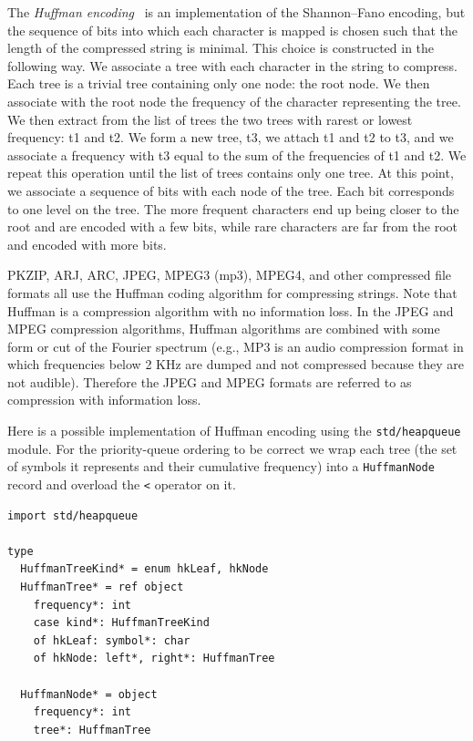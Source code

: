 \documentclass[justified, sixbynine]{tufte-book}
\def\ft{\small\tt}
\theoremstyle{plain}%
\newtheorem * {corollary}{Corollary}
\theoremstyle{definition}
\theoremstyle{remark}
\newtheorem * {remark}{Remark}
\newtheorem * {note}{Note}
\begin{document}
\begin{fullwidth}
The {\it Huffman encoding}~\cite{huffman} is an implementation of the Shannon--Fano encoding, but the sequence of bits into which each character is mapped is chosen such that the length of the compressed string is minimal.
This choice is constructed in the following way.
We associate a tree with each character
in the string to compress. Each tree is a trivial tree containing only one
node: the root node. We then associate with the root node the frequency of the
character representing the tree. We then extract from the list of trees the
two trees with rarest or lowest frequency: t1 and t2. We form a new tree, t3, we attach
t1 and t2 to t3, and we associate a frequency with t3 equal to the sum of the
frequencies of t1 and t2. We repeat this operation until the list of trees
contains only one tree. At this point, we associate a sequence of bits with
each node of the tree. Each bit corresponds to one level on the tree. The
more frequent characters end up being closer to the root and are encoded
with a few bits, while rare characters are far from the root and encoded with
more bits.

PKZIP, ARJ, ARC, JPEG, MPEG3 (mp3), MPEG4, and other
compressed file formats all use the Huffman coding algorithm for compressing
strings. Note that Huffman is a compression algorithm with
no information loss. In the JPEG and MPEG compression algorithms, Huffman algorithms are
combined with some form or cut of the Fourier spectrum (e.g., MP3 is
an audio compression format in which frequencies below 2 KHz are dumped and not
compressed because they are not audible). Therefore the JPEG and MPEG
formats are referred to as compression with information loss.

Here is a possible implementation of Huffman encoding using the {\ft std/heapqueue} module. For the priority-queue ordering to be correct we wrap each tree (the set of symbols it represents and their cumulative frequency) into a {\ft HuffmanNode} record and overload the {\ft <} operator on it.

\begin{lstlisting}[caption={in file: {\ft nlib/compression.nim}}]
import std/heapqueue

type
  HuffmanTreeKind* = enum hkLeaf, hkNode
  HuffmanTree* = ref object
    frequency*: int
    case kind*: HuffmanTreeKind
    of hkLeaf: symbol*: char
    of hkNode: left*, right*: HuffmanTree

  HuffmanNode* = object
    frequency*: int
    tree*: HuffmanTree


\end{lstlisting}
\end{fullwidth}
\end{document}
